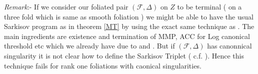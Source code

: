 \documentclass[12pt]{amsart}%
\theoremstyle{plain}
\theoremstyle{remark}
\theoremstyle{definition}
\newcommand{\<}{\leq}
\theoremstyle{definition}
\theoremstyle{definition}
\numberwithin{equation}{section}
\theoremstyle{remark}
\begin{document}
\textit{Remark}:- If we consider our foliated pair $(\mathcal{F},\Delta)$ on $Z$ to be terminal ( on a three fold  which is same as smooth foliation ) we might be able to have the usual Sarkisov program as in theorem \ref{MT} by using the exact same technique as \cite{BM97}. The main ingredients are existence and termination of MMP, ACC for Log canonical threshold etc which we already have due to \cite{CS20} and \cite{YC22}. But if $(\mathcal{F},\Delta)$ has canonnical singularity it is not clear how to define the Sarkisov Triplet ( c.f. \cite[Definition $1.4$]{BM97} ). Hence this technique fails for rank one foliations with caonical singularities.










\end{document}
